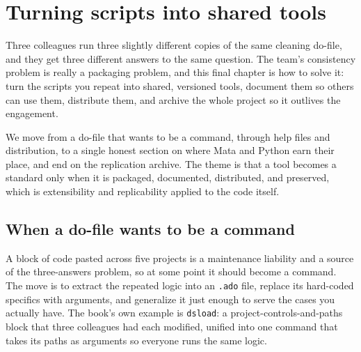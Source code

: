 \documentclass[
    a4paper,
    fontsize=10pt,
    twoside=true,
    numbers=noenddot,
]{kaobook}
\begin{document}
\chapter{Turning scripts into shared tools}\label{ch:tools}

Three colleagues run three slightly different copies of the same cleaning do-file, and they get three different answers to the same question. The team's consistency problem is really a packaging problem, and this final chapter is how to solve it: turn the scripts you repeat into shared, versioned tools, document them so others can use them, distribute them, and archive the whole project so it outlives the engagement.

We move from a do-file that wants to be a command, through help files and distribution, to a single honest section on where Mata and Python earn their place, and end on the replication archive. The theme is that a tool becomes a standard only when it is packaged, documented, distributed, and preserved, which is extensibility and replicability applied to the code itself.

\section{When a do-file wants to be a command}
A block of code pasted across five projects is a maintenance liability and a source of the three-answers problem, so at some point it should become a command. The move is to extract the repeated logic into an \texttt{.ado} file, replace its hard-coded specifics with arguments, and generalize it just enough to serve the cases you actually have. The book's own example is \texttt{dsload}: a project-controls-and-paths block that three colleagues had each modified, unified into one command that takes its paths as arguments so everyone runs the same logic.
\end{document}

